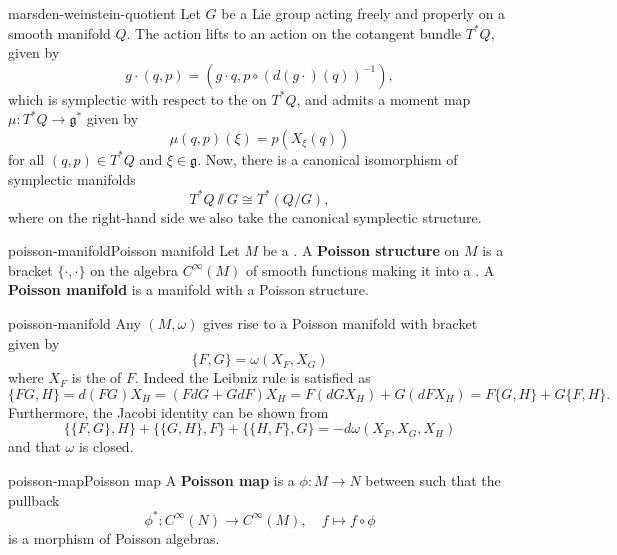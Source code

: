 \begin{example}{marsden-weinstein-quotient}
    Let $G$ be a Lie group acting freely and properly on a smooth manifold $Q$. The action lifts to an action on the cotangent bundle $T^* Q$, given by
    \[ g \cdot (q, p) = (g \cdot q, p \circ (d(g \cdot)(q))^{-1} ) , \]
    which is symplectic with respect to the  on $T^*Q$, and admits a moment map $\mu \colon T^*Q \to \mathfrak{g}^*$ given by
    \[ \mu(q, p)(\xi) = p(X_\xi(q)) \]
    for all $(q, p) \in T^*Q$ and $\xi \in \mathfrak{g}$. Now, there is a canonical isomorphism of symplectic manifolds
    \[ T^*Q \sslash G \cong T^*(Q / G) , \]
    where on the right-hand side we also take the canonical symplectic structure. %
\end{example}

\begin{topic}{poisson-manifold}{Poisson manifold}
    Let $M$ be a . A \textbf{Poisson structure} on $M$ is a bracket $\{ \cdot, \cdot \}$ on the algebra $C^\infty(M)$ of smooth functions making it into a . A \textbf{Poisson manifold} is a manifold with a Poisson structure.
\end{topic}

\begin{example}{poisson-manifold}
    Any  $(M, \omega)$ gives rise to a Poisson manifold with bracket given by
    \[ \{ F, G \} = \omega(X_F, X_G) \]
    where $X_F$ is the  of $F$.
    Indeed the Leibniz rule is satisfied as
    \[ \{ FG, H \} = d(FG) X_H = (F d G + G d F) X_H = F (d G X_H) + G (d F X_H) = F \{ G, H \} + G \{ F, H \} . \]
    Furthermore, the Jacobi identity can be shown from
    \[ \{ \{ F, G \}, H \} + \{ \{ G, H \}, F \} + \{ \{ H, F \}, G \} = -d \omega(X_F, X_G, X_H) \]
    and that $\omega$ is closed.
\end{example}

\begin{topic}{poisson-map}{Poisson map}
    A \textbf{Poisson map} is a  $\phi \colon M \to N$ between  such that the pullback
    \[ \phi^* \colon C^\infty(N) \to C^\infty(M), \quad f \mapsto f \circ \phi \]
    is a morphism of Poisson algebras.
\end{topic}

